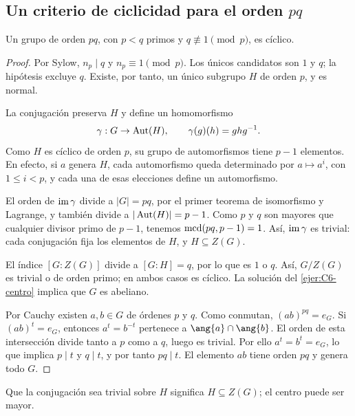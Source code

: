 \subsection{Un criterio de ciclicidad para el orden \texorpdfstring{$pq$}{pq}}\label{tema:7-3-2}
\begin{prop}\label{prop:C7-pq}
Un grupo de orden $pq$, con $p<q$ primos y $q\not\equiv1\pmod p$, es cíclico.
\end{prop}
\begin{proof}
Por Sylow, $n_p\mid q$ y $n_p\equiv1\pmod p$. Los únicos candidatos son $1$ y $q$; la hipótesis excluye $q$. Existe, por tanto, un único subgrupo $H$ de orden $p$, y es normal.

La conjugación preserva $H$ y define un homomorfismo
\[
\gamma:G\to\operatorname{Aut}(H),\qquad \gamma(g)(h)=ghg^{-1}.
\]
Como $H$ es cíclico de orden $p$, su grupo de automorfismos tiene $p-1$ elementos. En efecto, si $a$ genera $H$, cada automorfismo queda determinado por $a\mapsto a^i$, con $1\le i<p$, y cada una de esas elecciones define un automorfismo.

El orden de $\operatorname{im}\gamma$ divide a $|G|=pq$, por el primer teorema de isomorfismo y Lagrange, y también divide a $|\operatorname{Aut}(H)|=p-1$. Como $p$ y $q$ son mayores que cualquier divisor primo de $p-1$, tenemos $\operatorname{mcd}(pq,p-1)=1$. Así, $\operatorname{im}\gamma$ es trivial: cada conjugación fija los elementos de $H$, y $H\subseteq Z(G)$.

El índice $[G:Z(G)]$ divide a $[G:H]=q$, por lo que es $1$ o $q$. Así, $G/Z(G)$ es trivial o de orden primo; en ambos casos es cíclico. La solución del \cref{ejer:C6-centro} implica que $G$ es abeliano.

Por Cauchy existen $a,b\in G$ de órdenes $p$ y $q$. Como conmutan, $(ab)^{pq}=e_G$. Si $(ab)^t=e_G$, entonces $a^t=b^{-t}$ pertenece a $\ang{a}\cap\ang{b}$. El orden de esta intersección divide tanto a $p$ como a $q$, luego es trivial. Por ello $a^t=b^t=e_G$, lo que implica $p\mid t$ y $q\mid t$, y por tanto $pq\mid t$. El elemento $ab$ tiene orden $pq$ y genera todo $G$.
\end{proof}
\begin{obs}
Que la conjugación sea trivial sobre $H$ significa $H\subseteq Z(G)$; el centro puede ser mayor.
\end{obs}
